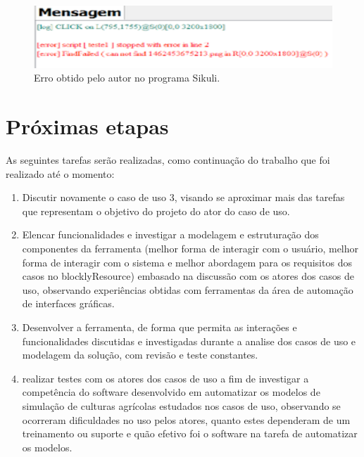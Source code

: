 \documentclass[tg]{mdtufsm}
\begin{document}
	\begin{figure}[!htb]
		{\centering
		\includegraphics[width=1.0\textwidth]{imagens/sikuli_error}
		\caption{Erro obtido pelo autor no programa Sikuli.}
		\label{fig:erroSikuli}}
	\end{figure}


	\chapter{Próximas etapas}

	As seguintes tarefas serão realizadas, como continuação do trabalho que foi realizado até o momento:

	\begin{enumerate}

		\item Discutir novamente o caso de uso 3, visando se aproximar mais das tarefas que representam o objetivo do projeto do ator do caso de uso.

		\item Elencar funcionalidades e investigar a modelagem e estruturação dos componentes da ferramenta (melhor forma de interagir com o usuário, melhor forma de interagir com o sistema e melhor abordagem para os requisitos dos casos no blocklyResource) embasado na discussão com os atores dos casos de uso, observando experiências obtidas com ferramentas da área de automação de interfaces gráficas.

		\item Desenvolver a ferramenta, de forma que permita as interações e funcionalidades discutidas e investigadas durante a analise dos casos de uso e modelagem da solução, com revisão e teste constantes.

		\item realizar testes com os atores dos casos de uso a fim de investigar a competência do software desenvolvido em automatizar os modelos de simulação de culturas agrícolas estudados nos casos de uso, observando se ocorreram dificuldades no uso pelos atores, quanto estes dependeram de um treinamento ou suporte e quão efetivo foi o software na tarefa de automatizar os modelos.

	\end{enumerate}

	\setlength{\baselineskip}{\baselineskip}
	
	
\end{document}

